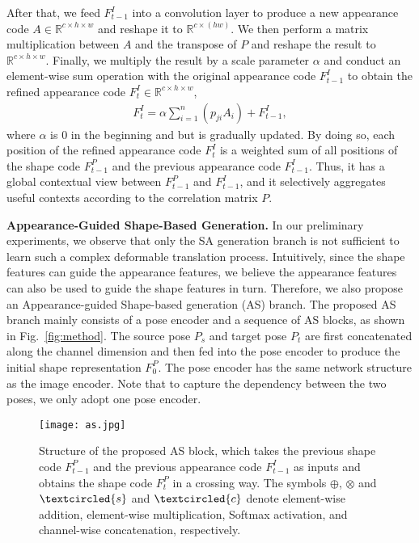 \documentclass[runningheads]{llncs}
\begin{document}
After that, we feed $F_{t-1}^I$ into a convolution layer to produce a new appearance code $A {\in} \mathbb{R}^{c \times h \times w}$ and reshape it to $\mathbb{R}^{c \times (h w)}$.
We then perform a matrix multiplication between $A$ and the transpose of $P$ and reshape the result to $\mathbb{R}^{c \times h \times w}$.
Finally, we multiply the result by a scale parameter $\alpha$ and conduct an element-wise sum operation with the original appearance code $F_{t-1}^I$ to obtain the refined appearance code $F_t^I \in \mathbb{R}^{c \times h \times w}$,
\begin{equation}
\begin{aligned}
F_t^I = \alpha \sum_{i=1}^{n}(p_{ji}  A_i) + F_{t-1}^I,
\end{aligned}
\end{equation}
where $\alpha$ is 0 in the beginning and but is gradually updated. By doing so, each position of the refined appearance code $F_t^I$ is a weighted sum of all positions of the shape code $F_{t-1}^P$ and the previous appearance code $F_{t-1}^I$.
Thus, it has a global contextual view between $F_{t-1}^P$ and $F_{t-1}^I$, and it selectively aggregates useful contexts according to the correlation matrix $P$. 

\noindent \textbf{Appearance-Guided Shape-Based Generation.}
In our preliminary experiments, we observe that only the SA generation branch is not sufficient to learn such a complex deformable translation process. Intuitively, since the shape features can guide the appearance features, we believe the appearance features can also be used to guide the shape features in turn.
Therefore, we also propose an Appearance-guided Shape-based generation (AS) branch.
The proposed AS branch mainly consists of a pose encoder and a sequence of AS blocks, as shown in Fig.~\ref{fig:method}.
The source pose $P_s$ and target pose $P_t$ are first concatenated along the channel dimension and then fed into the pose encoder to produce the initial shape representation $F_0^P$.
The pose encoder has the same network structure as the image encoder.
Note that to capture the dependency between the two poses, we only adopt one pose encoder.

\begin{figure}[t]
	\centering
	\texttt{[image: as.jpg]}
	\caption{Structure of the proposed AS block, which takes the previous shape code $F_{t-1}^P$ and the previous appearance code $F_{t-1}^I$ as inputs and obtains the shape code $F_{t}^P$ in a crossing way. The symbols $\oplus$, $\otimes$ and $\textcircled{s}$ and $\textcircled{c}$ denote element-wise addition, element-wise multiplication, Softmax activation, and channel-wise concatenation, respectively.}
	\label{fig:as}
\end{figure}
\end{document}
